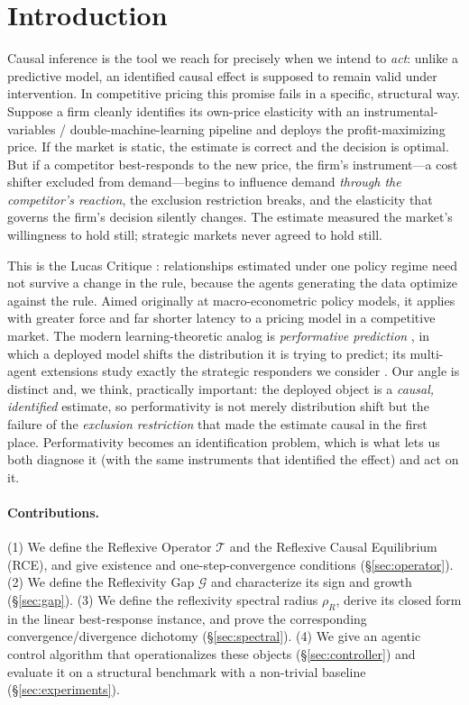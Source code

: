 \documentclass[11pt]{article}
\newcommand{\Tcal}{\mathcal{T}}
\newcommand{\Gcal}{\mathcal{G}}
\newcommand{\rhoR}{\rho_{R}}
\begin{document}
\section{Introduction}
Causal inference is the tool we reach for precisely when we intend to \emph{act}: unlike a
predictive model, an identified causal effect is supposed to remain valid under intervention.
In competitive pricing this promise fails in a specific, structural way. Suppose a firm cleanly
identifies its own-price elasticity with an instrumental-variables / double-machine-learning
pipeline and deploys the profit-maximizing price. If the market is static, the estimate is
correct and the decision is optimal. But if a competitor best-responds to the new price, the
firm's instrument---a cost shifter excluded from demand---begins to influence demand
\emph{through the competitor's reaction}, the exclusion restriction breaks, and the elasticity
that governs the firm's decision silently changes. The estimate measured the market's willingness
to hold still; strategic markets never agreed to hold still.

This is the Lucas Critique \cite{lucas1976}: relationships estimated under one policy regime need
not survive a change in the rule, because the agents generating the data optimize against the
rule. Aimed originally at macro-econometric policy models, it applies with greater force and far
shorter latency to a pricing model in a competitive market. The modern learning-theoretic analog
is \emph{performative prediction} \cite{perdomo2020}, in which a deployed model shifts the
distribution it is trying to predict; its multi-agent extensions study exactly the strategic
responders we consider \cite{narang2023,piliouras2023}. Our angle is distinct and, we think,
practically important: the deployed object is a \emph{causal, identified} estimate, so
performativity is not merely distribution shift but the failure of the \emph{exclusion
restriction} that made the estimate causal in the first place. Performativity becomes an
identification problem, which is what lets us both diagnose it (with the same instruments that
identified the effect) and act on it.

\paragraph{Contributions.} (1) We define the Reflexive Operator $\Tcal$ and the Reflexive Causal
Equilibrium (RCE), and give existence and one-step-convergence conditions
(\S\ref{sec:operator}). (2) We define the Reflexivity Gap $\Gcal$ and characterize its sign and
growth (\S\ref{sec:gap}). (3) We define the reflexivity spectral radius $\rhoR$, derive its
closed form in the linear best-response instance, and prove the corresponding
convergence/divergence dichotomy (\S\ref{sec:spectral}). (4) We give an agentic control algorithm
that operationalizes these objects (\S\ref{sec:controller}) and evaluate it on a structural
benchmark with a non-trivial baseline (\S\ref{sec:experiments}).
\end{document}
